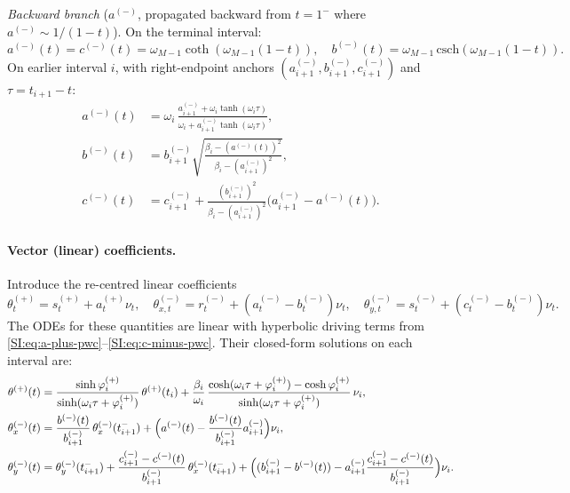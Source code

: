 \documentclass[11pt,onecolumn]{article}
\begin{document}
\textit{Backward branch} ($a^{(-)}$, propagated backward from
$t=1^-$ where $a^{(-)}\sim 1/(1-t)$).
On the terminal interval:
\begin{equation}
  a^{(-)}(t) = c^{(-)}(t) = \omega_{M-1}\coth(\omega_{M-1}(1-t)),
  \quad
  b^{(-)}(t) = \omega_{M-1}\,\mathrm{csch}(\omega_{M-1}(1-t)).
  \label{SI:eq:abc-terminal}
\end{equation}
On earlier interval $i$, with right-endpoint anchors
$(a^{(-)}_{i+1},b^{(-)}_{i+1},c^{(-)}_{i+1})$ and $\tau=t_{i+1}-t$:
\begin{align}
  a^{(-)}(t)
  &= \omega_i\,
     \frac{a^{(-)}_{i+1} + \omega_i\tanh(\omega_i\tau)}
          {\omega_i + a^{(-)}_{i+1}\tanh(\omega_i\tau)},
  \label{SI:eq:a-minus-pwc}\\
  b^{(-)}(t)
  &= b^{(-)}_{i+1}
     \sqrt{\frac{\beta_i-(a^{(-)}(t))^2}
                {\beta_i-(a^{(-)}_{i+1})^2}},
  \label{SI:eq:b-minus-pwc}\\
  c^{(-)}(t)
  &= c^{(-)}_{i+1}
     + \frac{(b^{(-)}_{i+1})^2}{\beta_i-(a^{(-)}_{i+1})^2}
       \bigl(a^{(-)}_{i+1}-a^{(-)}(t)\bigr).
  \label{SI:eq:c-minus-pwc}
\end{align}

\paragraph{Vector (linear) coefficients.}
Introduce the re-centred linear coefficients
\begin{equation}
  \theta_t^{(+)} = s_t^{(+)} + a_t^{(+)}\nu_t,
  \quad
  \theta_{x,t}^{(-)} = r_t^{(-)} + (a_t^{(-)}-b_t^{(-)})\nu_t,
  \quad
  \theta_{y,t}^{(-)} = s_t^{(-)} + (c_t^{(-)}-b_t^{(-)})\nu_t.
  \label{SI:eq:theta-def}
\end{equation}
The ODEs for these quantities are linear with hyperbolic driving terms
from \eqref{SI:eq:a-plus-pwc}--\eqref{SI:eq:c-minus-pwc}.
Their closed-form solutions on each interval are:
\begin{align}
  \theta^{(+)}(t)
  &= \frac{\sinh\varphi_i^{(+)}}
          {\sinh(\omega_i\tau+\varphi_i^{(+)})}\,
     \theta^{(+)}(t_i)
     + \frac{\beta_i}{\omega_i}\,
       \frac{\cosh(\omega_i\tau+\varphi_i^{(+)})-\cosh\varphi_i^{(+)}}
            {\sinh(\omega_i\tau+\varphi_i^{(+)})}\,\nu_i,
  \label{SI:eq:theta-plus-pwc}\\
  \theta_x^{(-)}(t)
  &= \frac{b^{(-)}(t)}{b^{(-)}_{i+1}}\,\theta_x^{(-)}(t_{i+1}^-)
     + \Bigl(a^{(-)}(t)
       - \frac{b^{(-)}(t)}{b^{(-)}_{i+1}}a^{(-)}_{i+1}\Bigr)\nu_i,
  \label{SI:eq:theta-x-pwc}\\
  \theta_y^{(-)}(t)
  &= \theta_y^{(-)}(t_{i+1}^-)
     + \frac{c^{(-)}_{i+1}-c^{(-)}(t)}{b^{(-)}_{i+1}}\,
       \theta_x^{(-)}(t_{i+1}^-)
     + \Bigl((b^{(-)}_{i+1}-b^{(-)}(t))
       - a^{(-)}_{i+1}
         \frac{c^{(-)}_{i+1}-c^{(-)}(t)}{b^{(-)}_{i+1}}\Bigr)\nu_i.
  \label{SI:eq:theta-y-pwc}
\end{align}
\end{document}
